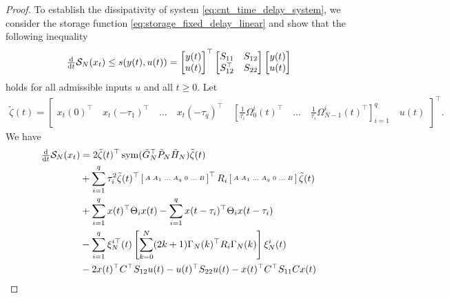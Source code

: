 \documentclass[12pt]{article}
\DeclareMathOperator{\sym}{sym}
\begin{document}
\begin{proof}
To establish the 
dissipativity of system \eqref{eq:cnt_time_delay_system}, 
we consider the storage 
function \eqref{eq:storage_fixed_delay_linear} and show that 
the following inequality 
\begin{align}
    \tfrac{\rm d}{ {\rm d}t}\mathcal{S}_{N}(x_t)  
\leq s(y(t),u(t))=\begin{bmatrix}
    y(t)\\ u(t)
\end{bmatrix}^\top\begin{bmatrix}
    S_{11} & S_{12}\\ S_{12}^\top & S_{22}
\end{bmatrix}\begin{bmatrix}
    y(t)\\ u(t)
\end{bmatrix} 
\end{align}
holds for all admissible inputs $u$ and all $t\geq 0$. 
Let \begin{align*}
 \tilde\zeta(t)=\left[\begin{smallmatrix}x_t(0)^\top \quad x_t(-\tau_1)^\top \quad \ldots \quad x_t(-\tau_q)^\top\quad \left[\frac{1}{\tau_i}\Omega_0^{i}(t)^\top\quad \ldots \quad \frac{1}{\tau_i}\Omega_{N-1}^{i}(t)^\top\right]_{i=1}^q \quad u(t)
\end{smallmatrix}\right]^\top.\end{align*}
We have
\begin{align*}
    \tfrac{\rm d}{ {\rm d}t}\mathcal{S}_{N}(x_t)  
&=2 \tilde \zeta(t)^\top\sym( \tilde G_{N}^\top \tilde P_N\tilde H_{N}) \tilde\zeta(t)\\
&\footnotesize +\sum_{i=1}^q \tau_i^2 
\tilde \zeta(t)^\top\left[ \begin{smallmatrix}
    A & A_1 & \ldots & A_q &0&\ldots &B
\end{smallmatrix}\right]^\top R_i \left[\begin{smallmatrix}
    A & A_1 & \ldots & A_q &0&\ldots &B
\end{smallmatrix}\right]\tilde\zeta(t)
\\ 
&+\footnotesize\sum_{i=1}^q
x(t)^\top\Theta_i x(t)- \sum_{i=1}^q x(t-\tau_i)^\top\Theta_i x(t-\tau_i)\\
&-\footnotesize\sum_{i=1}^q \xi_N^{i \top}(t)  \left[ 
\sum_{k=0}^{N} (2k+1) \Gamma_N(k)^\top R_i 
\Gamma_N(k) \right] \xi^i_N(t)\\
&-2x(t)^\top C^\top S_{12}u(t)-u(t)^\top S_{22} u(t)-x(t)^\top C^\top S_{11} Cx(t)\\

\end{align*}
\end{proof}
\end{document}

